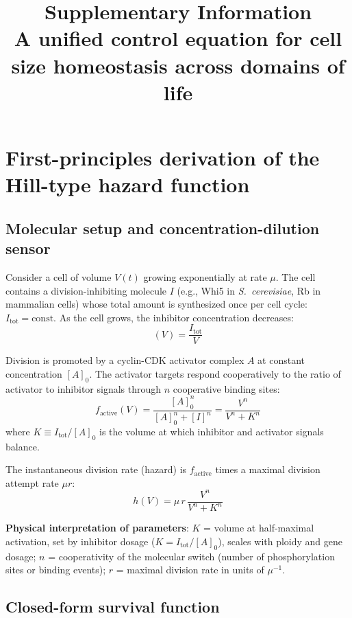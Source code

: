 \documentclass[11pt]{article}
\title{\textbf{Supplementary Information}\\[0.5em]
A unified control equation for cell size homeostasis across domains of life}
\author{}
\date{}
\begin{document}
\maketitle
\tableofcontents
\clearpage

\section{First-principles derivation of the Hill-type hazard function}

\subsection{Molecular setup and concentration-dilution sensor}

Consider a cell of volume $V(t)$ growing exponentially at rate $\mu$.
The cell contains a division-inhibiting molecule $I$ (e.g., Whi5 in
\textit{S.~cerevisiae}, Rb in mammalian cells) whose total amount is
synthesized once per cell cycle: $I_{\mathrm{tot}} = \text{const}$.
As the cell grows, the inhibitor concentration decreases:
\begin{equation}
  [I](V) = \frac{I_{\mathrm{tot}}}{V}
\end{equation}

Division is promoted by a cyclin-CDK activator complex $A$ at constant
concentration $[A]_0$.  The activator targets respond cooperatively to
the ratio of activator to inhibitor signals through $n$ cooperative
binding sites:
\begin{equation}
  f_{\mathrm{active}}(V) = \frac{[A]_0^n}{[A]_0^n + [I]^n}
    = \frac{V^n}{V^n + K^n}
\end{equation}
where $K \equiv I_{\mathrm{tot}} / [A]_0$ is the volume at which
inhibitor and activator signals balance.

The instantaneous division rate (hazard) is $f_{\mathrm{active}}$
times a maximal division attempt rate $\mu r$:
\begin{equation}
  h(V) = \mu \, r \, \frac{V^n}{V^n + K^n}
\end{equation}

\textbf{Physical interpretation of parameters}:
$K$ = volume at half-maximal activation, set by inhibitor dosage
($K = I_{\mathrm{tot}}/[A]_0$), scales with ploidy and gene dosage;
$n$ = cooperativity of the molecular switch (number of phosphorylation
sites or binding events);
$r$ = maximal division rate in units of $\mu^{-1}$.

\subsection{Closed-form survival function}
\end{document}
